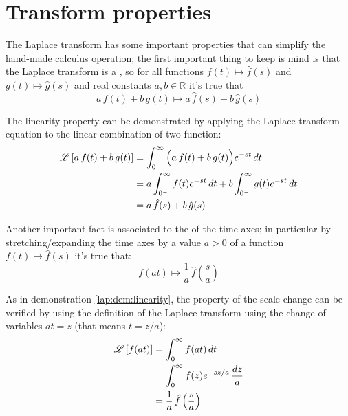 \section{Transform properties}
	
	The Laplace transform has some important properties that can simplify the hand-made calculus operation; the first important thing to keep is mind is that the Laplace transform is a , so for all functions $f(t)\mapsto \hat f(s)$ and $g(t)\mapsto \hat g(s)$ and real constants $a,b\in \mathds R$ it's true that
	\begin{equation}
		a \, f(t) + b\, g(t) \mapsto a\, \hat f(s) + b \, \hat g(s)
	\end{equation} 
	
	\begin{demonstration} \label{lap:dem:linearity}
		The linearity property can be demonstrated by applying the Laplace transform equation to the linear combination of two function:
		\begin{align*}
			\mathscr{L} \left[ a \, f(t) + b\, g(t) \right] & = \int_{0^-}^\infty \Big( a\, f(t) + b\, g(t)\Big)e^{-st}\, dt \\
			& = a \int_{0^-}^\infty f(t) e^{-st}\, dt + b \int_{0^-}^\infty g(t) e^{-st}\, dt \\
			& = a \, \hat f(s) + b \, \hat g(s)
		\end{align*}
	\end{demonstration}
	
	Another important fact is associated to the  of the time axes; in particular by stretching/expanding the time axes by a value $a>0$ of a function $f(t) \mapsto \hat f(s)$ it's true that:
	\begin{equation}
		f(at) \mapsto \frac 1 a \, \hat f\left(\frac s a\right)
	\end{equation}

	\begin{demonstration}
		As in demonstration \ref{lap:dem:linearity}, the property of the scale change can be verified by using the definition of the Laplace transform using the change of variables $at = z$ (that means $t= z/a$):
		\begin{align*}
			\mathscr{L} \left[ f(at) \right] & = \int_{0^-}^\infty f(at)\, dt \\
			& = \int_{0^-}^\infty f(z) e^{-sz/a} \, \frac{dz}{a} \\
			& = \frac 1 a \, \hat f\left(\frac s a\right)
		\end{align*}
	\end{demonstration}
		
